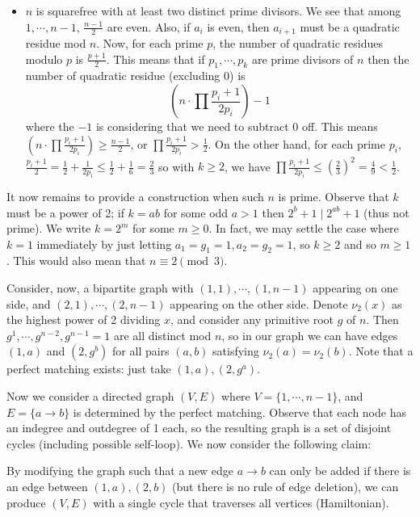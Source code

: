 \documentclass[11pt,a4paper]{article}
\begin{document}
\begin{enumerate}
\begin{itemize}
		\item $n$ is squarefree with at least two distinct prime divisors. 
		We see that among $1, \cdots, n-1$, $\frac{n-1}{2}$ are even. 
		Also, if $a_i$ is even, then $a_{i+1}$ must be a quadratic residue mod $n$. 
		Now, for each prime $p$, the number of quadratic residues modulo $p$ is $\frac{p+1}{2}$. 
		This means that 
		if $p_1, \cdots, p_k$ are prime divisors of $n$ then the number of quadratic residue (excluding 0) is 
		\[
		\left(n\cdot \prod \frac{p_i+1}{2p_i}\right)- 1
		\]
		where the $-1$ is considering that we need to subtract 0 off. 
		This means $\left(n\cdot \prod \frac{p_i+1}{2p_i}\right)\ge \frac{n-1}{2}$, 
		or $\prod \frac{p_i+1}{2p_i}>\frac 12$. 
		On the other hand, for each prime $p_i$, $\frac{p_i+1}{2}=\frac 12 + \frac{1}{2p_i} \le \frac 12 + \frac 16=\frac 23$ so 
		with $k\ge 2$, 
		we have $\prod \frac{p_i+1}{2p_i}\le (\frac 23)^2=\frac 49 < \frac 12$. 
	\end{itemize}
    
    It now remains to provide a construction when such $n$ is prime. 
    Observe that $k$ must be a power of 2; 
    if $k=ab$ for some odd $a > 1$ then $2^b+1\mid 2^{ab}+1$ (thus not prime). 
    We write $k=2^m$ for some $m\ge 0$. 
    In fact, we may settle the case where $k=1$ immediately by just letting $a_1=g_1=1, a_2=g_2=1$, 
    so $k\ge 2$ and so $m\ge 1$. 
    This would also mean that $n\equiv 2\pmod{3}$. 
    
    Consider, now, a bipartite graph with $(1, 1), \cdots, (1, n-1)$ appearing on one side, 
    and $(2, 1), \cdots, (2, n-1)$ appearing on the other side. 
    Denote $\nu_2(x)$ as the highest power of 2 dividing $x$, 
    and consider any primitive root $g$ of $n$. 
    Then $g^1, \cdots, g^{n-2}, g^{n-1}=1$ are all distinct mod $n$, 
    so in our graph we can have edges $(1, a)$ and $(2, g^b)$ for all pairs $(a, b)$ satisfying $\nu_2(a)=\nu_2(b)$. 
    Note that a perfect matching exists: 
    just take $(1, a), (2, g^a)$. 
    
    Now we consider a directed graph $(V, E)$ where $V=\{1, \cdots, n-1\}$, 
    and $E=\{a\to b\}$ is determined by the perfect matching. 
    Observe that each node has an indegree and outdegree of 1 each, so the resulting graph is a set of disjoint cycles (including possible self-loop). 
    We now consider the following claim: 
    \begin{lemma}
    	By modifying the graph such that a new edge $a\to b$ can only be added if there is an edge between $(1, a), (2, b)$ (but there is no rule of edge deletion), 
    	we can produce $(V, E)$ with a single cycle that traverses all vertices (Hamiltonian). 
    \end{lemma}
    

\end{enumerate}
\end{document}
